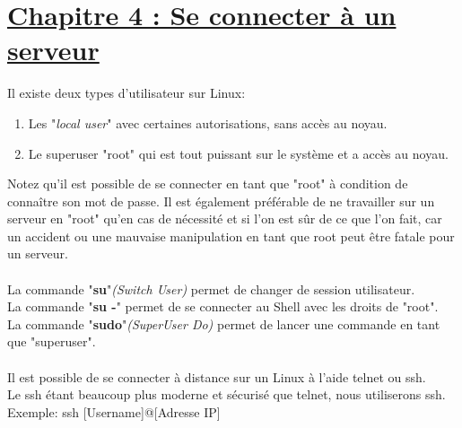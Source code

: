 \documentclass[12pt, a4paper]{article}
\begin{document}
\section*{\underline{Chapitre 4 : Se connecter à un serveur}}
Il existe deux types d'utilisateur sur Linux:
\begin{enumerate}
\setlength\itemsep{-0.4em}
\item Les "\emph{local user}" avec certaines autorisations, sans accès au noyau.
\item Le superuser "root" qui est tout puissant sur le système et a accès au noyau.
\end{enumerate}
Notez qu'il est possible de se connecter en tant que "root" à condition de connaître son mot de passe. Il est également préférable de ne travailler sur un serveur en "root" qu'en cas de nécessité et si l'on est sûr de ce que l'on fait, car un accident ou une mauvaise manipulation en tant que root peut être fatale pour un serveur.\\
\\
La commande "\textbf{su}"\emph{(Switch User)} permet de changer de session utilisateur.\\
La commande "\textbf{su -}" permet de se connecter au Shell avec les droits de "root".\\
La commande "\textbf{sudo}"\emph{(SuperUser Do)} permet de lancer une commande en tant que "superuser".\\
\\
Il est possible de se connecter à distance sur un Linux à l'aide telnet ou ssh.\\
Le ssh étant beaucoup plus moderne et sécurisé que telnet, nous utiliserons ssh.\\
Exemple: ssh [Username]@[Adresse IP]\\
\end{document}

